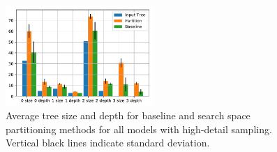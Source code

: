 \begin{figure}[htb]
	\centering
	\includegraphics[width=0.5\textwidth]{figures/g2.pdf}
	\caption{Average tree size and depth for baseline and search space partitioning methods for all models with high-detail sampling. Vertical black lines indicate standard deviation.}
	\label{fig:graph2}
\end{figure}
